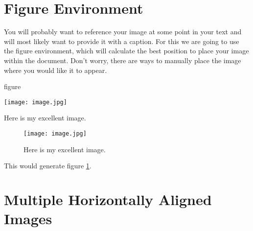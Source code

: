 \section{Figure Environment}
You will probably want to reference your image at some point in your text and
will most likely want to provide it with a caption.  For this we are going to
use the figure environment, which will calculate the best position to place 
your image within the document.  Don't worry, there are ways to manually place 
the image where you would like it to appear.
\begin{docEnvironment}[doclang/environment content=image content goes here]{figure}{}{}
    \begin{dispListing}
        \begin{center}
        \texttt{[image: image.jpg]}
        \end{center}
        \caption{Here is my excellent image.}
        \label{fig:img###}
        \end{dispListing}
\end{docEnvironment}
\begin{figure}[h]
    \begin{center}
    \texttt{[image: image.jpg]}
    \end{center}
    \caption{Here is my excellent image.}
    \label{fig:img001}
\end{figure}
This would generate figure \ref{fig:img001}.

\section{Multiple Horizontally Aligned Images}

